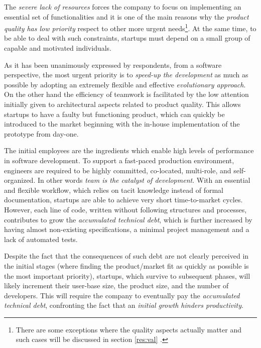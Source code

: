 \documentclass[10pt,journal,letterpaper,compsoc]{IEEEtran}
\begin{document}
The \textit{severe lack of resources} forces the company to focus on 
implementing an essential set of functionalities and it is one of the main 
reasons why the \textit{product quality has low priority} respect to other more 
urgent needs\footnote{There are some exceptions where the quality aspects 
actually matter and such cases will be discussed in section \ref{res:val}%
.}. At the same time, to be able to deal with such constraints, startups must 
depend on a small group of capable and motivated individuals.

As it has been unanimously expressed by respondents, from a software 
perspective, the most urgent priority is to \textit{speed-up the development} as 
much as possible by adopting an extremely flexible and effective 
\textit{evolutionary approach}. On the other hand the efficiency of teamwork is 
facilitated by the low attention initially given to architectural aspects 
related to product quality. This allows startups to have a faulty but 
functioning product, which can quickly be introduced to the market beginning 
with the in-house implementation of the prototype from day-one.

The initial employees are the ingredients which enable high levels of 
performance in software development. To support a fast-paced production 
environment, engineers are required to be highly committed, co-located, 
multi-role, and self-organized. In other words \textit{team is the catalyst of 
development}.
With an essential and flexible workflow, which relies on tacit knowledge 
instead of formal documentation, startups are able to achieve very short 
time-to-market cycles. However, each line of code, written without following 
structures and processes, contributes to grow the \textit{accumulated technical 
debt}, which is further increased by having almost non-existing specifications, 
a minimal project management and a lack of automated tests.

Despite the fact that the consequences of such debt are not clearly perceived 
in the initial stages (where finding the product/market fit as quickly as 
possible is the most important priority), startups, which survive to subsequent 
phases, will likely increment their user-base size, the product size, and the 
number of developers. This will require the company to eventually pay the 
\textit{accumulated technical debt}, confronting the fact that an 
\textit{initial growth hinders productivity}.
\end{document}
